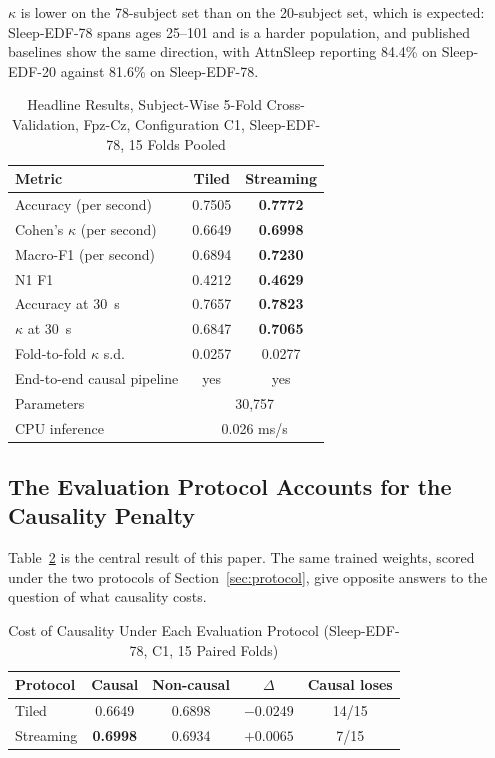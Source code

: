 \documentclass[conference]{IEEEtran}
\begin{document}
$\kappa$ is lower on the 78-subject set than on the 20-subject set, which is expected: Sleep-EDF-78
spans ages 25--101 and is a harder population, and published baselines show the same direction, with
AttnSleep reporting 84.4\% on Sleep-EDF-20 against 81.6\% on Sleep-EDF-78.

\begin{table}[t]
\caption{Headline Results, Subject-Wise 5-Fold Cross-Validation, Fpz-Cz, Configuration C1,
Sleep-EDF-78, 15 Folds Pooled}
\label{tab:headline}
\centering
\begin{tabular}{lcc}
\toprule
Metric & Tiled & \textbf{Streaming} \\
\midrule
Accuracy (per second)         & 0.7505 & \textbf{0.7772} \\
Cohen's $\kappa$ (per second) & 0.6649 & \textbf{0.6998} \\
Macro-F1 (per second)         & 0.6894 & \textbf{0.7230} \\
N1 F1                         & 0.4212 & \textbf{0.4629} \\
Accuracy at 30~s              & 0.7657 & \textbf{0.7823} \\
$\kappa$ at 30~s              & 0.6847 & \textbf{0.7065} \\
Fold-to-fold $\kappa$ s.d.    & 0.0257 & 0.0277 \\
\midrule
End-to-end causal pipeline    & yes & yes \\
Parameters                    & \multicolumn{2}{c}{30{,}757} \\
CPU inference                 & \multicolumn{2}{c}{0.026 ms/s} \\
\bottomrule
\end{tabular}
\end{table}

\subsection{The Evaluation Protocol Accounts for the Causality Penalty}
\label{sec:results-protocol}

Table~\ref{tab:protocol} is the central result of this paper. The same trained weights, scored under
the two protocols of Section~\ref{sec:protocol}, give opposite answers to the question of what
causality costs.

\begin{table}[t]
\caption{Cost of Causality Under Each Evaluation Protocol (Sleep-EDF-78, C1, 15 Paired Folds)}
\label{tab:protocol}
\centering
\begin{tabular}{lcccc}
\toprule
Protocol & Causal & Non-causal & $\Delta$ & Causal loses \\
\midrule
Tiled     & 0.6649 & 0.6898 & $-0.0249$ & 14/15 \\
Streaming & \textbf{0.6998} & 0.6934 & $\mathbf{+0.0065}$ & 7/15 \\
\bottomrule
\end{tabular}
\end{table}
\end{document}
